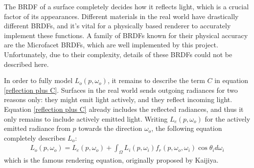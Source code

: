 The BRDF of a surface completely decides how it reflects light, which is a crucial factor of its appearances. Different materials in the real world have drastically different BRDFs, and it's vital for a physically based renderer to accurately implement these functions. A family of BRDFs known for their physical accuracy are the Microfacet BRDFs\cite{cook1982reflectance}, which are well implemented by this project. Unfortunately, due to their complexity, details of these BRDFs could not be described here. 


In order to fully model $L_o(p,\omega_o)$, it remains to describe the term $C$ in equation \ref{reflection plus C}. Surfaces in the real world sends outgoing radiances for two reasons only: they might emit light actively, and they reflect incoming light. Equation \ref{reflection plus C} already includes the reflected radiances, and thus it only remains to include actively emitted light. Writing $L_e(p,\omega_o)$ for the actively emitted radiance from $p$ towards the direction $\omega_o$, the following equation completely describes $L_o$:
\begin{align}
    L_o(p,\omega_o) = L_e(p,\omega_o) + \int_\Omega L_i(p,\omega_i)f_r(p,\omega_o,\omega_i)\cos\theta_id\omega_i
    \label{rendering equation}
\end{align}
which is the famous rendering equation, originally proposed by Kaijiya\cite{rendering_equation}. 


